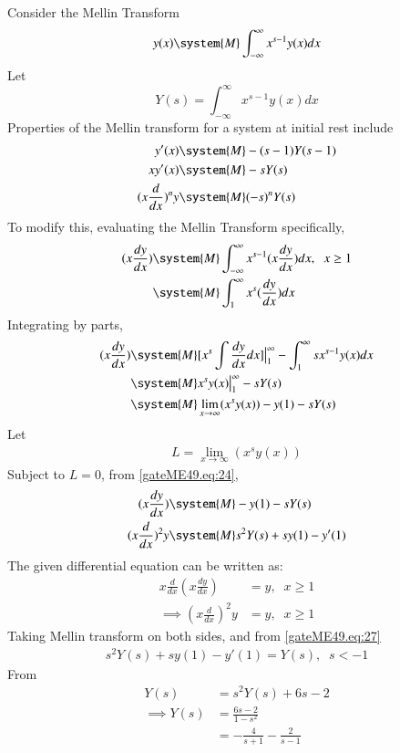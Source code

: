 \documentclass[journal,12pt,twocolumn]{IEEEtran}
\theoremstyle{remark}
\begin{document}
Consider the Mellin Transform
\begin{align}
    y(x)\system{M}\int_{-\infty}^{\infty} x^{s-1}y(x){dx} 
\end{align}
 Let $$Y(s)=\int_{-\infty}^{\infty} x^{s-1}y(x){dx} $$ 
 Properties of the Mellin transform for a system at initial rest include 
\begin{align}
    y'(x) &\system{M} -(s-1)Y(s-1)\\
    xy'(x) &\system{M} -s Y(s)\\
    (x\frac{d}{dx})^ny&\system{M} (-s)^nY(s) 
\end{align}
To modify this, evaluating the Mellin Transform specifically,
\begin{align}
    (x\frac{dy}{dx}) &\system{M} \int_{-\infty}^{\infty} x^{s-1}(x\frac{dy}{dx}){dx}, \;\;x\geq1\\ 
    &\system{M} \int_{1}^{\infty} x^{s}(\frac{dy}{dx}){dx}
\end{align} 
Integrating by parts, 
\begin{align}
    (x\frac{dy}{dx}) &\system{M} [x^s\int \frac{dy}{dx}dx ]\big{|}_1 ^{\infty}-\int_1^{\infty} sx^{s-1}y(x)dx\\
    &\system{M} x^sy(x)\big{|}_1^{\infty} -sY(s)\\
    &\system{M} \lim_{x\rightarrow{\infty}} (x^s y(x))-y(1)-sY(s)
\end{align} 
Let \begin{align} L=\lim_{x\rightarrow{\infty}} (x^s y(x)) \label{gateME49.eq: 10}\end{align}
Subject to $L=0$, from \eqref{gateME49.eq:24}, 
\begin{align}
    (x\frac{dy}{dx}) &\system{M} -y(1)-sY(s)\\
    (x\frac{d}{dx})^2 y &\system {M} s^2Y(s)+sy(1)-y'(1)
\end{align}
The given differential equation can be written as: 
\begin{align}
    x\frac{d}{dx}(x\frac{dy}{dx})&=y,\;\;x\geq 1\\
    \implies (x\frac{d}{dx})^2y&=y,\;\;x\geq 1
\end{align}
Taking Mellin transform on both sides, and from \eqref{gateME49.eq:27} 
\begin{align}
    s^2Y(s)+sy(1)-y'(1)=Y(s),\;\;s<-1
\end{align}
From 
\begin{align}
    Y(s)&=s^2Y(s)+6s-2\\
    \implies Y(s)&= \frac{6s-2}{1-s^2}\\&=-\frac{4}{s+1}-\frac{2}{s-1}
\end{align}
\end{document}
